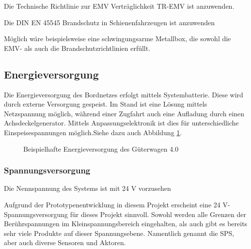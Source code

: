 \begin{feat}
Die Technische Richtlinie zur EMV Verträglichkeit TR-EMV ist anzuwenden.
\end{feat}
\begin{feat}
Die \acrshort{DIN} \acrshort{EN} 45545 Brandschutz in Schienenfahrzeugen ist anzuwenden
\end{feat}
\begin{rem}[zu Anf. 6-8]
Möglich wäre beispielsweise eine schwingungsarme Metallbox, die sowohl die EMV- als auch die Brandschutzrichtlinien erfüllt.
\end{rem}

\subsection{Energieversorgung}\label{sec:EV}
Die Energieversorgung des Bordnetzes erfolgt mittels Systembatterie. Diese wird durch externe Versorgung gespeist. Im Stand ist eine Lösung mittels Netzspannung möglich, während einer Zugfahrt auch eine Aufladung durch einen Achsdeckelgenerator. Mittels Anpassungselektronik ist dies für unterschiedliche Einspeisespannungen möglich.Siehe dazu auch Abbildung \ref{fig:Soll-EV}. 
\begin{figure}[htp]
    \centering
    
    \caption{Beispielhafte Energieversorgung des Güterwagen 4.0}
    \label{fig:Soll-EV}
\end{figure}

\subsubsection{Spannungsversorgung}
\begin{feat}
Die Nennspannung des Systems ist mit 24 V vorzusehen
\end{feat}
\begin{rem}[zu Anf. 9]
Aufgrund der Prototypenentwicklung in diesem Projekt erscheint eine 24 V-Spannungsversorgung für dieses Projekt sinnvoll. Sowohl werden alle Grenzen der Berührspannungen im Kleinspannungsbereich eingehalten, als auch gibt es bereits sehr viele Produkte auf dieser Spannungsebene. Namentlich genannt die SPS, aber auch diverse Sensoren und Aktoren.
\end{rem}
